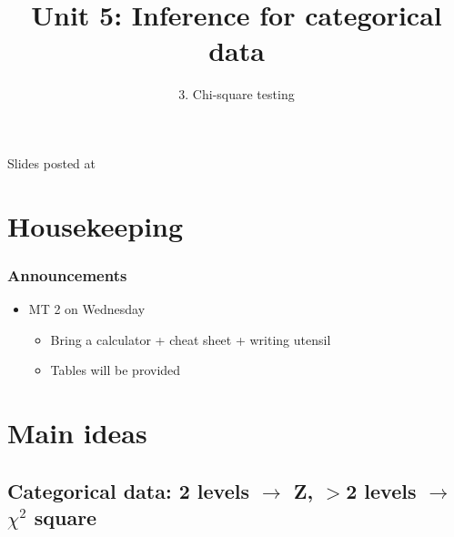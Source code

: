 \documentclass[11pt,containsverbatim,handout,xcolor=xelatex,dvipsnames,table]{beamer}
\title{Unit 5: Inference for categorical data}
\subtitle{3. Chi-square testing}
\author{\CourseName}
\date{}
\institute{\InstituteName}
\begin{document}



\begin{frame}[plain]

\titlepage

\vfill

{\scriptsize {} \hfill Slides posted at  \webURL{\CourseSite}}

\addtocounter{framenumber}{-1} 

\end{frame}


\section{Housekeeping}


\begin{frame}
\frametitle{Announcements}

\begin{itemize}

\item MT 2 on Wednesday
\begin{itemize}
\item Bring a calculator + cheat sheet + writing utensil
\item Tables will be provided
\end{itemize}

\end{itemize}

\end{frame}


\section{Main ideas}


\subsection{Categorical data: 2 levels $\rightarrow$ Z, $>$2 levels $\rightarrow$ $\chi^2$ square}
\label{mi1}

\end{document}
